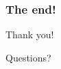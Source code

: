 \documentclass{beamer}
\begin{document}

\begin{frame}
  \frametitle{The end!}
  \Huge
  \begin{center}
    Thank you!
  \end{center}
  \begin{center}
    Questions?
  \end{center}
\end{frame}

\end{document}
